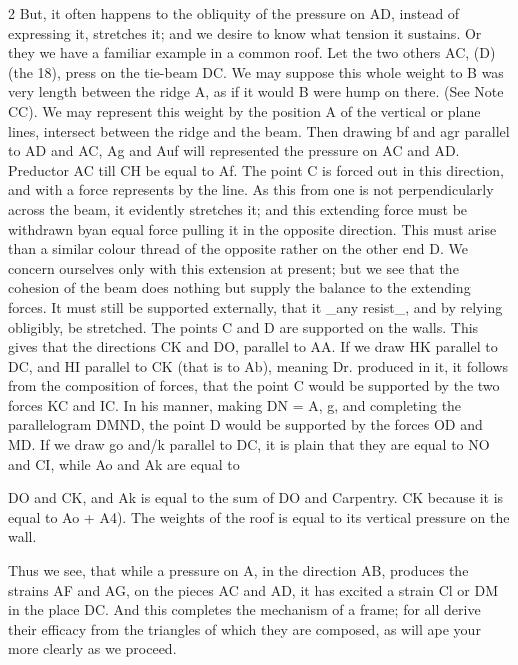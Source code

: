 \documentclass[10pt]{article}
\begin{document}
\begin{multicols}{2}
But, it often happens to the obliquity of the pressure on AD, instead of expressing it, stretches it; and we desire to know what tension it sustains. Or they we have a familiar example in a common roof. Let the two others AC, (D) (the 18), press on the tie-beam DC. We may suppose this whole weight to B was very length between the ridge A, as if it would B were hump on there. (See Note CC). We may represent this weight by the position A of the vertical or plane lines, intersect between the ridge and the beam. Then drawing bf and agr parallel to AD and AC, Ag and Auf will represented the pressure on AC and AD. Preductor AC till CH be equal to Af. The point C is forced out in this direction, and with a force represents by the line. As this from one is not perpendicularly across the beam, it evidently stretches it; and this extending force must be withdrawn byan equal force pulling it in the opposite direction. This must arise than a similar colour thread of the opposite rather on the other end D. We concern ourselves only with this extension at present; but we see that the cohesion of the beam does nothing but supply the balance to the extending forces. It must still be supported externally, that it \_any resist\_, and by relying obligibly, be stretched. The points C and D are supported on the walls. This gives that the directions CK and DO, parallel to AA. If we draw HK parallel to DC, and HI parallel to CK (that is to Ab), meaning Dr. produced in it, it follows from the composition of forces, that the point C would be supported by the two forces KC and IC. In his manner, making DN = A, g, and completing the parallelogram DMND, the point D would be supported by the forces OD and MD. If we draw go and/k parallel to DC, it is plain that they are equal to NO and CI, while Ao and Ak are equal to

DO and CK, and Ak is equal to the sum of DO and Carpentry. CK because it is equal to Ao + A4). The weights of the roof is equal to its vertical pressure on the wall.

Thus we see, that while a pressure on A, in the direction AB, produces the strains AF and AG, on the pieces AC and AD, it has excited a strain Cl or DM in the place DC. And this completes the mechanism of a frame; for all derive their efficacy from the triangles of which they are composed, as will ape your more clearly as we proceed.


\end{multicols}
\end{document}
